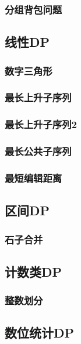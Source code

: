 \documentclass[10pt,a4paper]{article}
\begin{document}
\subsubsection{分组背包问题}

\subsection{线性DP}
\subsubsection{数字三角形}

\subsubsection{最长上升子序列}

\subsubsection{最长上升子序列2}

\subsubsection{最长公共子序列}

\subsubsection{最短编辑距离}

\subsection{区间DP}
\subsubsection{石子合并}

\subsection{计数类DP}
\subsubsection{整数划分}

\subsection{数位统计DP}
\end{document}
